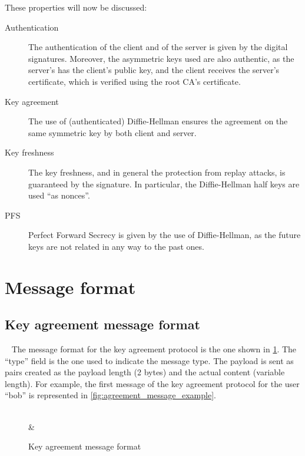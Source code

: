 These properties will now be discussed:
\begin{description}
    \item[Authentication] The authentication of the client and of the server is given by the digital signatures. Moreover, the asymmetric keys used are also authentic, as the server's has the client's public key, and the client receives the server's certificate, which is verified using the root CA's certificate.
    \item[Key agreement] The use of (authenticated) Diffie-Hellman ensures the agreement on the same symmetric key by both client and server.
    \item[Key freshness] The key freshness, and in general the protection from replay attacks, is guaranteed by the signature. In particular, the Diffie-Hellman half keys are used ``as nonces''.
    \item[PFS] Perfect Forward Secrecy is given by the use of Diffie-Hellman, as the future keys are not related in any way to the past ones.
\end{description}


\section{Message format}
\subsection{Key agreement message format}\
\label{subsec:key_agreement_format}
The message format for the key agreement protocol is the one shown in \cref{fig:agreement_message_format}. The ``type'' field is the one used to indicate the message type. The payload is sent as pairs created as the payload length (2 bytes) and the actual content (variable length).
For example, the first message of the key agreement protocol for the user ``bob'' is represented in \cref{fig:agreement_message_example}.
\begin{figure}[!ht]
    \centering
    \begin{bytefield}{40}
         \\
         &  \\
    \end{bytefield}
    \caption{Key agreement message format}
    \label{fig:agreement_message_format}
\end{figure}

